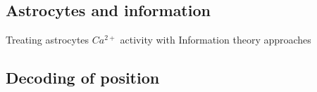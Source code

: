 \subsection{Astrocytes and information}
\label{chap1:sec:3:subsec1:astro_info}
Treating astrocytes $Ca^{2+}$ activity with Information theory approaches

\subsection{Decoding of position}
\label{chap1:sec:3:subsec2:position_decoding}





